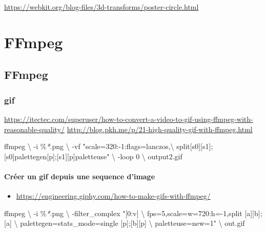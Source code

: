 \documentclass[
  french,
]{book}
\newenvironment{Shaded}{\begin{snugshade}}{\end{snugshade}}
\newcommand{\DataTypeTok}[1]{\textcolor[rgb]{0.13,0.29,0.53}{#1}}
\newcommand{\ExtensionTok}[1]{#1}
\newcommand{\NormalTok}[1]{#1}
\newcommand{\PreprocessorTok}[1]{\textcolor[rgb]{0.56,0.35,0.01}{\textit{#1}}}
\newcommand{\StringTok}[1]{\textcolor[rgb]{0.31,0.60,0.02}{#1}}
\providecommand{\tightlist}{%
  \setlength{\itemsep}{0pt}\setlength{\parskip}{0pt}}
\begin{document}
\url{https://webkit.org/blog-files/3d-transforms/poster-circle.html}

\hypertarget{ffmpeg}{%
\chapter{FFmpeg}\label{ffmpeg}}

\hypertarget{ffmpeg-1}{%
\section{FFmpeg}\label{ffmpeg-1}}

\hypertarget{gif}{%
\subsection{gif}\label{gif}}

\url{https://itectec.com/superuser/how-to-convert-a-video-to-gif-using-ffmpeg-with-reasonable-quality/}
\url{http://blog.pkh.me/p/21-high-quality-gif-with-ffmpeg.html}

\begin{Shaded}
\begin{Highlighting}[]
\ExtensionTok{ffmpeg}  \DataTypeTok{\textbackslash{}}
\NormalTok{{-}i \%}\PreprocessorTok{*}\NormalTok{.png }\DataTypeTok{\textbackslash{}}
\NormalTok{{-}vf }\StringTok{"scale=320:{-}1:flags=lanczos,}\DataTypeTok{\textbackslash{}}
\StringTok{split[s0][s1];[s0]palettegen[p];[s1][p]paletteuse"} \DataTypeTok{\textbackslash{}}
\NormalTok{{-}loop 0 }\DataTypeTok{\textbackslash{}}
\NormalTok{output2.gif}
\end{Highlighting}
\end{Shaded}

\hypertarget{cruxe9er-un-gif-depuis-une-sequence-dimage}{%
\subsubsection{Créer un gif depuis une sequence d'image}\label{cruxe9er-un-gif-depuis-une-sequence-dimage}}

\begin{itemize}
\tightlist
\item
  \url{https://engineering.giphy.com/how-to-make-gifs-with-ffmpeg/}
\end{itemize}

\begin{Shaded}
\begin{Highlighting}[]
\ExtensionTok{ffmpeg} \DataTypeTok{\textbackslash{}}
\NormalTok{{-}i \%}\PreprocessorTok{*}\NormalTok{.png }\DataTypeTok{\textbackslash{}}
\NormalTok{{-}filter\_complex }\StringTok{"[0:v] }\DataTypeTok{\textbackslash{}}
\StringTok{fps=5,scale=w=720:h={-}1,split [a][b];[a] }\DataTypeTok{\textbackslash{}}
\StringTok{palettegen=stats\_mode=single [p];[b][p] }\DataTypeTok{\textbackslash{}}
\StringTok{paletteuse=new=1"} \DataTypeTok{\textbackslash{}}
\NormalTok{out.gif}
\end{Highlighting}
\end{Shaded}
\end{document}

